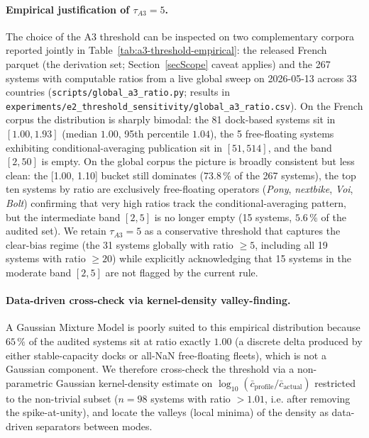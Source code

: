 \documentclass[11pt,a4paper]{article}
\begin{document}
\paragraph{Empirical justification of $\tau_{A3} = 5$.}
The choice of the A3 threshold can be inspected on two
complementary corpora reported jointly in
Table~\ref{tab:a3-threshold-empirical}: the released French
parquet (the derivation set; Section~\ref{secScope} caveat
applies) and the 267 systems with computable ratios from a
live global sweep on 2026-05-13 across 33 countries
(\texttt{scripts/global\_a3\_ratio.py}; results in
\texttt{experiments/e2\_threshold\_sensitivity/global\_a3\_ratio.csv}).
On the French corpus the distribution is sharply bimodal: the
81 dock-based systems sit in $[1.00, 1.93]$
(median $1.00$, 95th percentile $1.04$), the 5 free-floating
systems exhibiting conditional-averaging publication sit in
$[51, 514]$, and the band $[2, 50]$ is empty. On the global
corpus the picture is broadly consistent but less clean: the
[1.00, 1.10] bucket still dominates ($73.8\,\%$ of the 267
systems), the top ten systems by ratio are exclusively
free-floating operators (\emph{Pony}, \emph{nextbike},
\emph{Voi}, \emph{Bolt}) confirming that very high ratios track
the conditional-averaging pattern, but the intermediate band
$[2, 5]$ is no longer empty (15 systems, $5.6\,\%$ of the
audited set). We retain $\tau_{A3} = 5$ as a conservative
threshold that captures the clear-bias regime (the 31 systems
globally with ratio $\geq 5$, including all 19 systems with
ratio $\geq 20$) while explicitly acknowledging that 15 systems
in the moderate band $[2, 5]$ are not flagged by the current
rule.

\paragraph{Data-driven cross-check via kernel-density valley-finding.}
A Gaussian Mixture Model is poorly suited to this empirical
distribution because $65\,\%$ of the audited systems sit at ratio
exactly $1.00$ (a discrete delta produced by either stable-capacity
docks or all-NaN free-floating fleets), which is not a Gaussian
component. We therefore cross-check the threshold via a
non-parametric Gaussian kernel-density estimate on
$\log_{10}(\bar c_{\text{profile}}/\bar c_{\text{actual}})$
restricted to the non-trivial subset ($n = 98$ systems with
ratio $> 1.01$, i.e. after removing the spike-at-unity), and
locate the valleys (local minima) of the density as
data-driven separators between modes.
\end{document}
